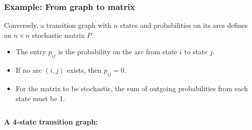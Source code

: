 \documentclass[aspectratio=169]{beamer}\usepackage[]{graphicx}\usepackage[]{xcolor}
\begin{document}
\begin{frame}
    \frametitle{Example: From graph to matrix}
    
    Conversely, a transition graph with $n$ states and probabilities on its arcs defines an $n \times n$ stochastic matrix $P$.
    
    \begin{itemize}
        \item The entry $p_{ij}$ is the probability on the arc from state $i$ to state $j$.
        \item If no arc $(i, j)$ exists, then $p_{ij} = 0$.
        \item For the matrix to be stochastic, the sum of outgoing probabilities from each state must be 1.
    \end{itemize}
    
    \begin{columns}[T]
        
        \begin{column}{.55\textwidth}
            \centering
            \textbf{A 4-state transition graph:}
            \bigskip
            
        \end{column}
        

\end{columns}
\end{frame}
\end{document}

